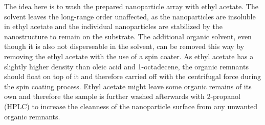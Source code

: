 \documentclass[\main/dresen_thesis.tex]{subfiles}
\begin{document}
    The idea here is to wash the prepared nanoparticle array with ethyl acetate.
    The solvent leaves the long-range order unaffected, as the nanoparticles are insoluble in ethyl acetate and the individual nanoparticles are stabilized by the nanostructure to remain on the substrate.
    The additional organic solvent, even though it is also not disperseable in the solvent, can be removed this way by removing the ethyl acetate with the use of a spin coater.
    As ethyl acetate has a slightly higher density than oleic acid and 1-octadecene, the organic remnants should float on top of it and therefore carried off with the centrifugal force during the spin coating process.
    Ethyl acetate might leave some organic remains of its own and therefore the sample is further washed afterwards with 2-propanol (HPLC) to increase the cleanness of the nanoparticle surface from any unwanted organic remnants.
\end{document}
